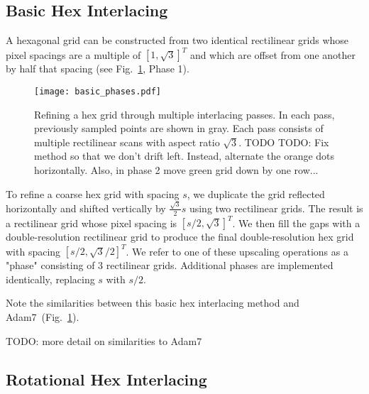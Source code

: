 \documentclass{article}
\newcommand{\reffig}[1]{Fig.~\ref{fig:#1}}
\begin{document}
\subsection{Basic Hex Interlacing}
\label{double-grid-interlacing}

A hexagonal grid can be constructed from two identical rectilinear grids
whose pixel spacings are a multiple of $[1, \sqrt{3}]^T$ and which are offset from one another by half that spacing (see Fig.~\ref{fig:basicphases}, Phase 1).

\begin{figure}[ht]
\centering
\texttt{[image: basic\_phases.pdf]}
\caption{
\label{fig:basicphases} Refining a hex grid through multiple interlacing passes.
%
In each pass, previously sampled points are shown in gray.
%
Each pass consists of multiple rectilinear scans with aspect ratio $\sqrt{3}$.
%
TODO TODO: Fix method so that we don't drift left. Instead, alternate the orange dots horizontally. Also, in phase 2 move green grid down by one row...
}
\end{figure}

To refine a coarse hex grid with spacing $s$, we duplicate the grid reflected horizontally and shifted vertically by $\frac{\sqrt{3}}{2} s$ using two rectilinear grids.
%
The result is a rectilinear grid whose pixel spacing is $[s/2, \sqrt{3}]^T$.
%
We then fill the gaps with a double-resolution rectilinear grid to produce the final double-resolution hex grid with spacing $[s/2, \sqrt{3}/2]^T$.
%
%
We refer to one of these upscaling operations as a "phase" consisting of 3 rectilinear grids.
%
Additional phases are implemented identically, replacing $s$ with $s/2$.



Note the similarities between this basic hex interlacing method and Adam7~(\reffig{basicphases}).

TODO: more detail on similarities to Adam7

\subsection{Rotational Hex Interlacing}
\label{triple-grid-interlacing}
\end{document}
